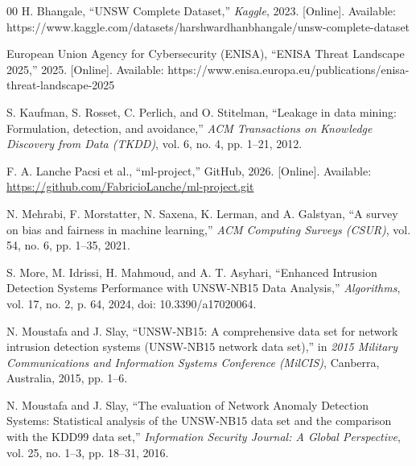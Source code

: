 \documentclass[conference]{IEEEtran}
\begin{document}
\begin{thebibliography}{00}
H. Bhangale,
``UNSW Complete Dataset,''
\textit{Kaggle}, 2023. [Online]. Available:
https://www.kaggle.com/datasets/harshwardhanbhangale/unsw-complete-dataset

European Union Agency for Cybersecurity (ENISA),
``ENISA Threat Landscape 2025,''
2025. [Online]. Available:
https://www.enisa.europa.eu/publications/enisa-threat-landscape-2025

S. Kaufman, S. Rosset, C. Perlich, and O. Stitelman,
``Leakage in data mining: Formulation, detection, and avoidance,''
\textit{ACM Transactions on Knowledge Discovery from Data (TKDD)},
vol. 6, no. 4, pp. 1--21, 2012.

F. A. Lanche Pacsi et al.,
``ml-project,''
GitHub, 2026. [Online]. Available:
\url{https://github.com/FabricioLanche/ml-project.git}

N. Mehrabi, F. Morstatter, N. Saxena, K. Lerman, and A. Galstyan,
``A survey on bias and fairness in machine learning,''
\textit{ACM Computing Surveys (CSUR)},
vol. 54, no. 6, pp. 1--35, 2021.

S. More, M. Idrissi, H. Mahmoud, and A. T. Asyhari,
``Enhanced Intrusion Detection Systems Performance with UNSW-NB15 Data Analysis,''
\textit{Algorithms},
vol. 17, no. 2, p. 64, 2024, doi: 10.3390/a17020064.

N. Moustafa and J. Slay,
``UNSW-NB15: A comprehensive data set for network intrusion detection systems (UNSW-NB15 network data set),''
in \textit{2015 Military Communications and Information Systems Conference (MilCIS)},
Canberra, Australia, 2015, pp. 1--6.

N. Moustafa and J. Slay,
``The evaluation of Network Anomaly Detection Systems: Statistical analysis of the UNSW-NB15 data set and the comparison with the KDD99 data set,''
\textit{Information Security Journal: A Global Perspective},
vol. 25, no. 1--3, pp. 18--31, 2016.

\end{thebibliography}
\end{document}
